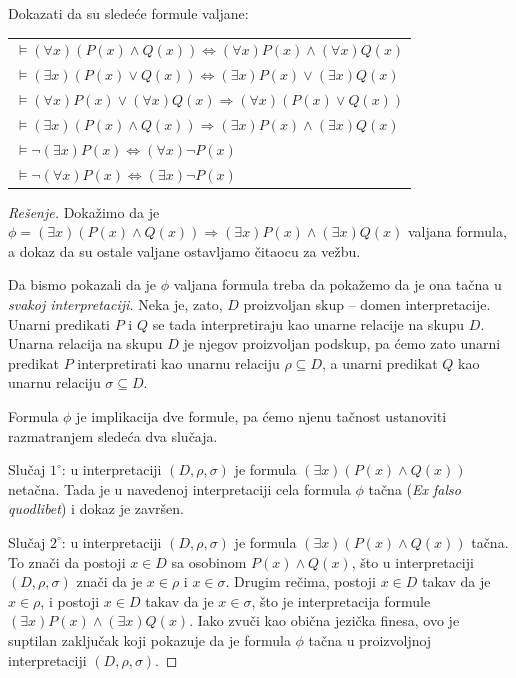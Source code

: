\begin{EX}
  Dokazati da su slede\'ce formule valjane:

  \medskip
  
  \begin{tabular}{l}
  $\vDash (\forall x)(P(x) \land Q(x)) \Leftrightarrow (\forall x)P(x) \land (\forall x)Q(x)$\\[3mm]
  $\vDash (\exists x)(P(x) \lor Q(x))  \Leftrightarrow (\exists x)P(x) \lor  (\exists x)Q(x)$\\[3mm]
  $\vDash (\forall x)P(x) \lor (\forall x)Q(x) \Rightarrow (\forall x)(P(x) \lor Q(x))$\\[3mm]
  $\vDash (\exists x)(P(x) \land Q(x)) \Rightarrow (\exists x)P(x) \land (\exists x)Q(x)$\\[3mm]
  $\vDash \lnot(\exists x)P(x) \Leftrightarrow (\forall x)\lnot P(x)$\\[3mm]
  $\vDash \lnot(\forall x)P(x) \Leftrightarrow (\exists x)\lnot P(x)$
  \end{tabular}
\end{EX}
\begin{proof}[Re\v senje]
  Doka\v zimo da je $\phi = (\exists x)(P(x) \land Q(x)) \Rightarrow (\exists x)P(x) \land (\exists x)Q(x)$ valjana formula,
  a dokaz da su ostale valjane ostavljamo \v citaocu za ve\v zbu.
  
  Da bismo pokazali da je $\phi$ valjana formula
  treba da poka\v zemo da je ona ta\v cna u \emph{svakoj interpretaciji.}
  Neka je, zato, $D$ proizvoljan skup -- domen interpretacije. Unarni predikati $P$ i $Q$ se tada interpretiraju
  kao unarne relacije na skupu $D$. Unarna relacija na skupu $D$ je njegov proizvoljan podskup, pa \'cemo
  zato unarni predikat $P$ interpretirati kao unarnu relaciju $\rho \subseteq D$,
  a unarni predikat $Q$ kao unarnu relaciju $\sigma \subseteq D$.
  
  Formula $\phi$ je implikacija dve formule, pa \'cemo njenu ta\v cnost ustanoviti razmatranjem slede\'ca dva slu\v caja.
  
  Slu\v caj $1^\circ$: u interpretaciji $(D, \rho, \sigma)$ je formula $(\exists x)(P(x) \land Q(x))$ neta\v cna.
  Tada je u navedenoj interpretaciji cela formula $\phi$ ta\v cna (\emph{Ex falso quodlibet}) i dokaz je zavr\v sen.

  Slu\v caj $2^\circ$: u interpretaciji $(D, \rho, \sigma)$ je formula $(\exists x)(P(x) \land Q(x))$ ta\v cna.
  To zna\v ci da postoji $x \in D$ sa osobinom $P(x) \land Q(x)$, \v sto u interpretaciji $(D, \rho, \sigma)$
  zna\v ci da je $x \in \rho$ i $x \in \sigma$. Drugim re\v cima,
  postoji $x \in D$ takav da je $x \in \rho$, i postoji $x \in D$ takav da je $x \in \sigma$,
  \v sto je interpretacija formule $(\exists x)P(x) \land (\exists x)Q(x)$.
  Iako zvu\v ci kao obi\v cna jezi\v cka finesa, ovo je suptilan zaklju\v cak koji pokazuje da je
  formula $\phi$ ta\v cna u proizvoljnoj interpretaciji $(D, \rho, \sigma)$.
\end{proof}

